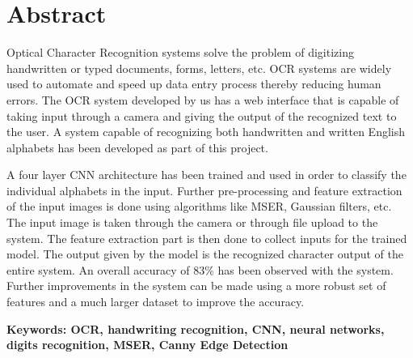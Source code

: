 \chapter*{Abstract}

Optical Character Recognition systems solve the problem of digitizing handwritten or typed documents, forms, letters, etc. OCR systems are widely used to automate and speed up data entry process thereby reducing human errors. The OCR system developed by us has a web interface that is capable of taking input through a camera and giving the output of the recognized text to the user. A system capable of recognizing both handwritten and written English alphabets has been developed as part of this project. 

A four layer CNN architecture has been trained and used in order to classify the individual alphabets in the input. Further pre-processing and feature extraction of the input images is done using algorithms like MSER, Gaussian filters, etc. The input image is taken through the camera or through file upload to the system. The feature extraction part is then done to collect inputs for the trained model. The output given by the model is the recognized character output of the entire system.
An overall accuracy of 83\% has been observed with the system. Further improvements in the system can be made using a more robust set of features and a much larger dataset to improve the accuracy.

\textbf{Keywords: OCR, handwriting recognition, CNN, neural networks, digits recognition, MSER, Canny Edge Detection}
